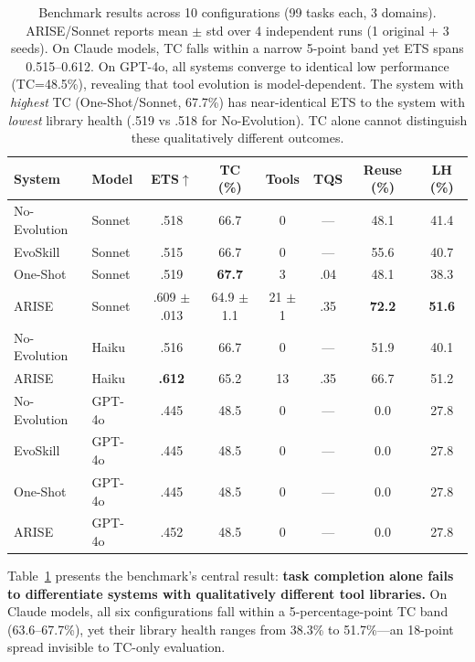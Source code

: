 \documentclass[10pt,twocolumn]{article}
\begin{document}
\begin{table}[t]
\centering
\small
\begin{tabular}{llcccccc}
\toprule
\textbf{System} & \textbf{Model} & \textbf{ETS}$\uparrow$ & \textbf{TC (\%)} & \textbf{Tools} & \textbf{TQS} & \textbf{Reuse (\%)} & \textbf{LH (\%)} \\
\midrule
No-Evolution & Sonnet & .518 & 66.7 & 0 & --- & 48.1 & 41.4 \\
EvoSkill & Sonnet & .515 & 66.7 & 0 & --- & 55.6 & 40.7 \\
One-Shot & Sonnet & .519 & \textbf{67.7} & 3 & .04 & 48.1 & 38.3 \\
ARISE & Sonnet & .609 $\pm$ .013 & 64.9 $\pm$ 1.1 & 21 $\pm$ 1 & .35 & \textbf{72.2} & \textbf{51.6} \\
\midrule
No-Evolution & Haiku & .516 & 66.7 & 0 & --- & 51.9 & 40.1 \\
ARISE & Haiku & \textbf{.612} & 65.2 & 13 & .35 & 66.7 & 51.2 \\
\midrule
No-Evolution & GPT-4o & .445 & 48.5 & 0 & --- & 0.0 & 27.8 \\
EvoSkill & GPT-4o & .445 & 48.5 & 0 & --- & 0.0 & 27.8 \\
One-Shot & GPT-4o & .445 & 48.5 & 0 & --- & 0.0 & 27.8 \\
ARISE & GPT-4o & .452 & 48.5 & 0 & --- & 0.0 & 27.8 \\
\bottomrule
\end{tabular}
\caption{Benchmark results across 10 configurations (99 tasks each, 3 domains). ARISE/Sonnet reports mean $\pm$ std over 4 independent runs (1 original + 3 seeds). On Claude models, TC falls within a narrow 5-point band yet ETS spans 0.515--0.612. On GPT-4o, all systems converge to identical low performance (TC=48.5\%), revealing that tool evolution is model-dependent. The system with \emph{highest} TC (One-Shot/Sonnet, 67.7\%) has near-identical ETS to the system with \emph{lowest} library health (.519 vs .518 for No-Evolution). TC alone cannot distinguish these qualitatively different outcomes.}
\label{tab:results}
\end{table}

Table~\ref{tab:results} presents the benchmark's central result: \textbf{task completion alone fails to differentiate systems with qualitatively different tool libraries.} On Claude models, all six configurations fall within a 5-percentage-point TC band (63.6--67.7\%), yet their library health ranges from 38.3\% to 51.7\%---an 18-point spread invisible to TC-only evaluation.
\end{document}
